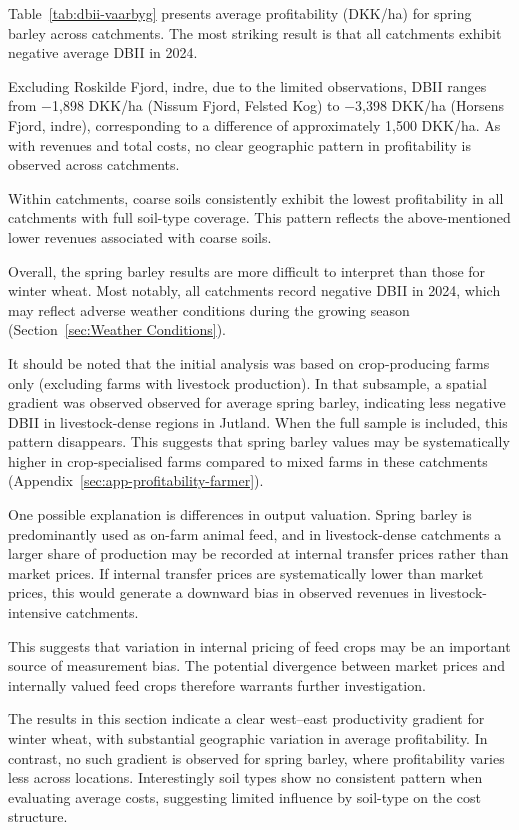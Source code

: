 \documentclass[12pt]{article}
\begin{document}
Table~\ref{tab:dbii-vaarbyg} presents average profitability (DKK/ha) for spring barley across catchments. 
The most striking result is that all catchments exhibit negative average DBII in 2024. 

Excluding Roskilde Fjord, indre, due to the limited observations, DBII ranges from $-$1,898 DKK/ha (Nissum Fjord, Felsted Kog) to $-$3,398 DKK/ha (Horsens Fjord, indre), corresponding to a difference of approximately 1,500 DKK/ha. As with revenues and total costs, no clear geographic pattern in profitability is observed across catchments.


Within catchments, coarse soils consistently exhibit the lowest profitability in all catchments with full soil-type coverage. 
This pattern reflects the above-mentioned lower revenues associated with coarse soils.

Overall, the spring barley results are more difficult to interpret than those for winter wheat. 
Most notably, all catchments record negative DBII in 2024, which may reflect adverse weather conditions during the growing season (Section~\ref{sec:Weather Conditions}).

 
It should be noted that the initial analysis was based on crop-producing farms only (excluding farms with livestock production). 
In that subsample, a spatial gradient was observed observed for average spring barley, indicating less negative DBII in livestock-dense regions in Jutland. 
When the full sample is included, this pattern disappears. 
This suggests that spring barley values may be systematically higher in crop-specialised farms compared to mixed farms in these catchments (Appendix~\ref{sec:app-profitability-farmer}).


One possible explanation is differences in output valuation. 
Spring barley is predominantly used as on-farm animal feed, and in livestock-dense catchments a larger share of production may be recorded at internal transfer prices rather than market prices. 
If internal transfer prices are systematically lower than market prices, this would generate a downward bias in observed revenues in livestock-intensive catchments.

This suggests that variation in internal pricing of feed crops may be an important source of measurement bias. 
The potential divergence between market prices and internally valued feed crops therefore warrants further investigation.

The results in this section indicate a clear west--east productivity gradient for winter wheat, with substantial geographic variation in average profitability. In contrast, no such gradient is observed for spring barley, where profitability varies less across locations. Interestingly soil types show no consistent pattern when evaluating average costs, suggesting limited influence by soil-type on the cost structure.
\end{document}
